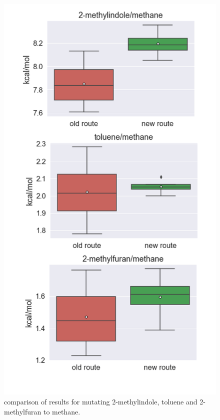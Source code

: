 \begin{figure}
	
	\includegraphics[scale=0.65]{results_3pairs1}
	\caption{comparison of results for mutating 2-methylindole, toluene and 2-methylfuran to methane.}
	\label{fig:boxplot_small}
\end{figure}


